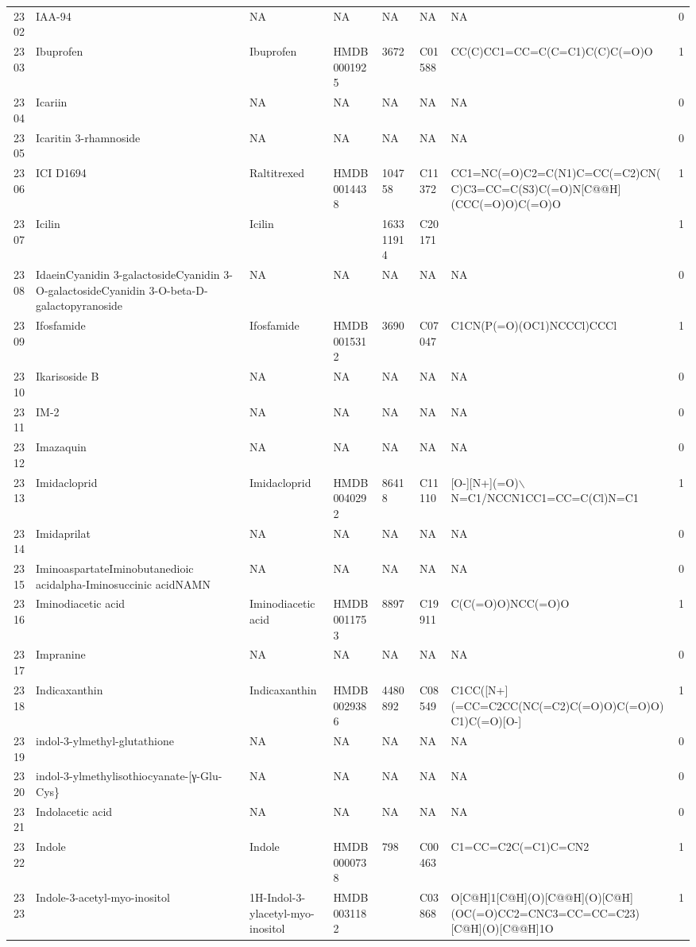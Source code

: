 \documentclass[a4paper]{article}
\begin{document}
\begin{longtable}{rlllllll}
  2302 & IAA-94 & NA & NA & NA & NA & NA & 0 \\ 
  2303 & Ibuprofen & Ibuprofen & HMDB0001925 & 3672 & C01588 & CC(C)CC1=CC=C(C=C1)C(C)C(=O)O & 1 \\ 
  2304 & Icariin & NA & NA & NA & NA & NA & 0 \\ 
  2305 & Icaritin 3-rhamnoside & NA & NA & NA & NA & NA & 0 \\ 
  2306 & ICI D1694 & Raltitrexed & HMDB0014438 & 104758 & C11372 & CC1=NC(=O)C2=C(N1)C=CC(=C2)CN(C)C3=CC=C(S3)C(=O)N[C@@H](CCC(=O)O)C(=O)O & 1 \\ 
  2307 & Icilin & Icilin &  & 163311914 & C20171 &  & 1 \\ 
  2308 & IdaeinCyanidin 3-galactosideCyanidin 3-O-galactosideCyanidin 3-O-beta-D-galactopyranoside & NA & NA & NA & NA & NA & 0 \\ 
  2309 & Ifosfamide & Ifosfamide & HMDB0015312 & 3690 & C07047 & C1CN(P(=O)(OC1)NCCCl)CCCl & 1 \\ 
  2310 & Ikarisoside B & NA & NA & NA & NA & NA & 0 \\ 
  2311 & IM-2 & NA & NA & NA & NA & NA & 0 \\ 
  2312 & Imazaquin & NA & NA & NA & NA & NA & 0 \\ 
  2313 & Imidacloprid & Imidacloprid & HMDB0040292 & 86418 & C11110 & [O-][N+](=O)$\backslash$N=C1/NCCN1CC1=CC=C(Cl)N=C1 & 1 \\ 
  2314 & Imidaprilat & NA & NA & NA & NA & NA & 0 \\ 
  2315 & IminoaspartateIminobutanedioic acidalpha-Iminosuccinic acidNAMN & NA & NA & NA & NA & NA & 0 \\ 
  2316 & Iminodiacetic acid & Iminodiacetic acid & HMDB0011753 & 8897 & C19911 & C(C(=O)O)NCC(=O)O & 1 \\ 
  2317 & Impranine & NA & NA & NA & NA & NA & 0 \\ 
  2318 & Indicaxanthin & Indicaxanthin & HMDB0029386 & 4480892 & C08549 & C1CC([N+](=CC=C2CC(NC(=C2)C(=O)O)C(=O)O)C1)C(=O)[O-] & 1 \\ 
  2319 & indol-3-ylmethyl-glutathione & NA & NA & NA & NA & NA & 0 \\ 
  2320 & indol-3-ylmethylisothiocyanate-[γ-Glu-Cys\} & NA & NA & NA & NA & NA & 0 \\ 
  2321 & Indolacetic acid & NA & NA & NA & NA & NA & 0 \\ 
  2322 & Indole & Indole & HMDB0000738 & 798 & C00463 & C1=CC=C2C(=C1)C=CN2 & 1 \\ 
  2323 & Indole-3-acetyl-myo-inositol & 1H-Indol-3-ylacetyl-myo-inositol & HMDB0031182 &  & C03868 & O[C@H]1[C@H](O)[C@@H](O)[C@H](OC(=O)CC2=CNC3=CC=CC=C23)[C@H](O)[C@@H]1O & 1 \\ 

\end{longtable}
\end{document}
